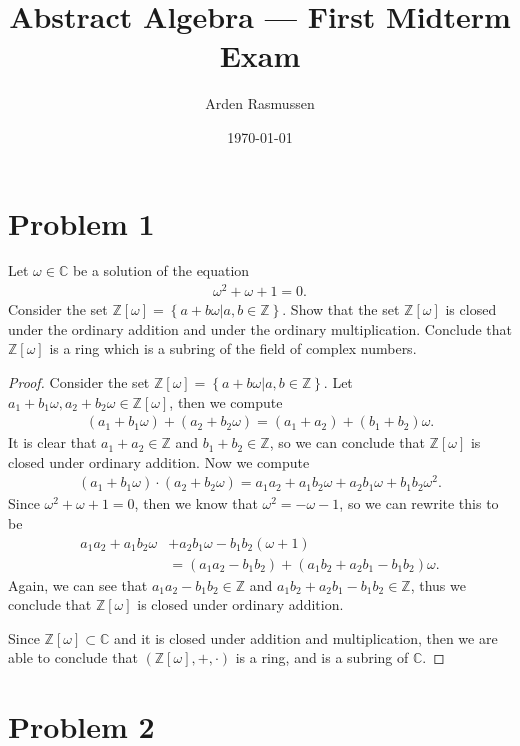 \documentclass[10pt]{armath}
\title{Abstract Algebra --- First Midterm Exam}
\author{Arden Rasmussen}
\date{\today}
\newcommand{\Z}{\mathbb{Z}}
\newcommand{\C}{\mathbb{C}}
\newcommand{\zw}{\mathbb{Z}\left[\omega\right]}
\begin{document}
\maketitle

\section*{Problem 1}%
\label{sec:problem_1}

Let $\omega\in\C$ be a solution of the equation
\begin{align*}
  \omega^2+\omega+1=0.
\end{align*}
Consider the set $\zw=\left\{a+b\omega\vert a,b\in\Z \right\}$. Show that the
set $\zw$ is closed under the ordinary addition and under the ordinary
multiplication. Conclude that $\zw$ is a ring which is a subring of the field of
complex numbers.

\begin{proof}
  Consider the set $\zw=\left\{a+b\omega\vert a,b\in\Z \right\}$. Let
  $a_1+b_1\omega,a_2+b_2\omega\in\zw$, then we compute
  \begin{align*}
    \left(a_1+b_1\omega\right)+\left(a_2+b_2\omega\right)=(a_1+a_2)+(b_1+b_2)\omega.
  \end{align*}
  It is clear that $a_1+a_2\in\Z$ and $b_1+b_2\in\Z$, so we can conclude that
  $\zw$ is closed under ordinary addition. Now we compute
  \begin{align*}
    \left(a_1+b_1\omega\right)\cdot\left(a_2+b_2\omega\right)=a_1a_2+a_1b_2\omega+a_2b_1\omega+b_1b_2\omega^2.
  \end{align*}
  Since $\omega^2+\omega+1=0$, then we know that $\omega^2=-\omega-1$, so we
  can rewrite this to be
  \begin{align*}
    a_1a_2+a_1b_2\omega&+a_2b_1\omega-b_1b_2(\omega+1)\\
    &=
    \left(a_1a_2-b_1b_2\right)+\left(a_1b_2+a_2b_1-b_1b_2\right)\omega.
  \end{align*}
  Again, we can see that $a_1a_2-b_1b_2\in\Z$ and $a_1b_2+a_2b_1-b_1b_2\in\Z$,
  thus we conclude that $\zw$ is closed under ordinary addition.

  Since $\zw\subset \C$ and it is closed under addition and multiplication,
  then we are able to conclude that $\left(\zw,+,\cdot\right)$ is a ring, and
  is a subring of $\C$.
\end{proof}

\section*{Problem 2}%
\label{sec:problem_2}
\end{document}
